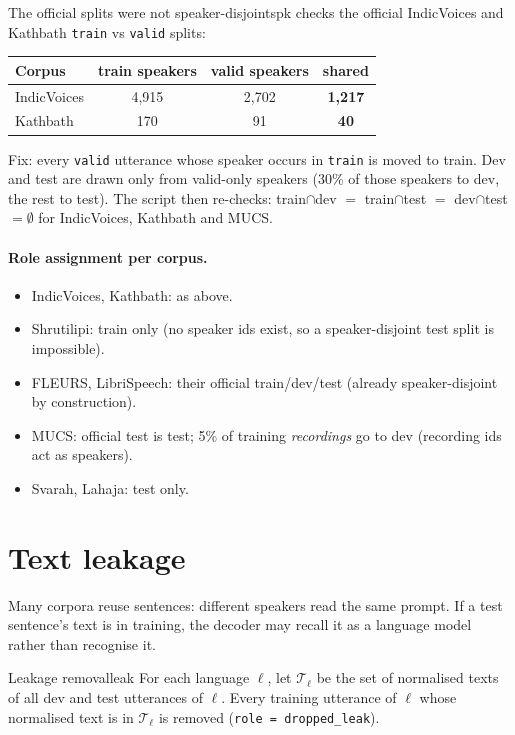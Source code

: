 \begin{example}{The official splits were not speaker-disjoint}{spk}
 checks the official IndicVoices and Kathbath \texttt{train} vs \texttt{valid} splits:
\begin{center}
\begin{tabular}{lccc}
\toprule
Corpus & train speakers & valid speakers & shared\\
\midrule
IndicVoices & 4{,}915 & 2{,}702 & \textbf{1{,}217}\\
Kathbath & 170 & 91 & \textbf{40}\\
\bottomrule
\end{tabular}
\end{center}
Fix: every \texttt{valid} utterance whose speaker occurs in \texttt{train} is moved to train. Dev and test are drawn only from
valid-only speakers (30\% of those speakers to dev, the rest to test). The script then re-checks: train$\cap$dev $=$
train$\cap$test $=$ dev$\cap$test $=\emptyset$ for IndicVoices, Kathbath and MUCS.
\end{example}

\paragraph{Role assignment per corpus.}
\begin{itemize}
\item IndicVoices, Kathbath: as above.
\item Shrutilipi: train only (no speaker ids exist, so a speaker-disjoint test split is impossible).
\item FLEURS, LibriSpeech: their official train/dev/test (already speaker-disjoint by construction).
\item MUCS: official test is test; 5\% of training \emph{recordings} go to dev (recording ids act as speakers).
\item Svarah, Lahaja: test only.
\end{itemize}

\section{Text leakage}

Many corpora reuse sentences: different speakers read the same prompt. If a test sentence's text is in training, the decoder may
recall it as a language model rather than recognise it.

\begin{definition}{Leakage removal}{leak}
For each language $\ell$, let $\mathcal T_\ell$ be the set of normalised texts of all dev and test utterances of $\ell$. Every training
utterance of $\ell$ whose normalised text is in $\mathcal T_\ell$ is removed (\texttt{role = dropped\_leak}).
\end{definition}

